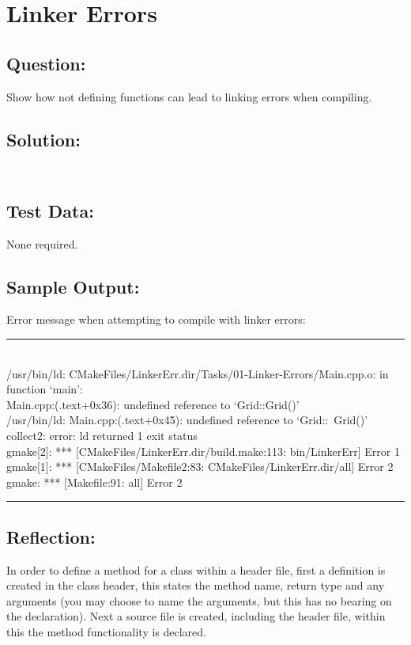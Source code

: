 \section{Linker Errors}
    \subsection*{Question:}
        Show how not defining functions can lead to linking errors when 
        compiling.
            
    \subsection*{Solution:}
        \inputminted{cpp}{../Tasks/01-Linker-Errors/Grid.h}
        \inputminted{cpp}{../Tasks/01-Linker-Errors/Grid.cpp}

    \subsection*{Test Data:}
        None required.
        
    \newpage
    \subsection*{Sample Output:}
        Error message when attempting to compile with linker errors:

        \par\noindent\rule{\textwidth}{0.5pt}\\{\scriptsize
            \noindent/usr/bin/ld: CMakeFiles/LinkerErr.dir/Tasks/01-Linker-Errors/Main.cpp.o: in function `main':\\
            Main.cpp:(.text+0x36): undefined reference to `Grid::Grid()'\\
            /usr/bin/ld: Main.cpp:(.text+0x45): undefined reference to `Grid::~Grid()'\\
            collect2: error: ld returned 1 exit status\\
            gmake[2]: *** [CMakeFiles/LinkerErr.dir/build.make:113: bin/LinkerErr] Error 1\\
            gmake[1]: *** [CMakeFiles/Makefile2:83: CMakeFiles/LinkerErr.dir/all] Error 2\\
            gmake: *** [Makefile:91: all] Error 2
        }\par\noindent\rule{\textwidth}{0.5pt}

    \subsection*{Reflection:}
        In order to define a method for a class within a header file,
        first a definition is created in the class header,
        this states the method name, return type and any arguments
        (you may choose to name the arguments, but this has no bearing on the declaration).
        Next a source file is created, including the header file,
        within this the method functionality is declared.